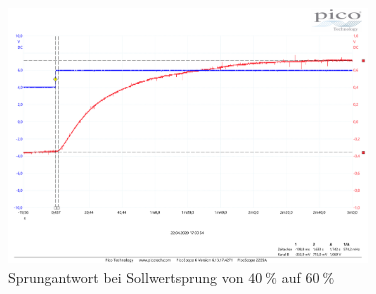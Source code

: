\begin{figure}[H]
    \begin{center}
        \includegraphics[width=0.85\textwidth]{pdf_ext/anlage5_messung2_u_uP_40_60.pdf}
        \caption{Sprungantwort bei Sollwertsprung von \( \SI{40}{\percent} \) auf \( \SI{60}{\percent} \)}
        \label{fig:M1_3_b_step}
    \end{center}
\end{figure}
 
 \newpage
 
